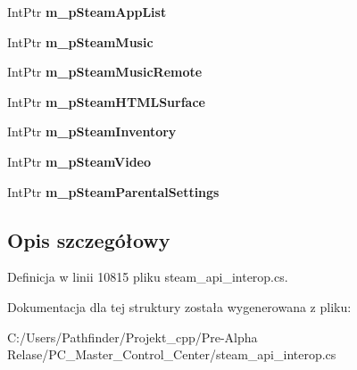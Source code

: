 \begin{DoxyCompactItemize}
Int\+Ptr {\bfseries m\+\_\+p\+Steam\+App\+List}
\item 
\mbox{\label{struct_valve_1_1_steamworks_1_1_c_steam_a_p_i_context_adb1ea8a12ae3246055bde67fe5fb74ab}} 
Int\+Ptr {\bfseries m\+\_\+p\+Steam\+Music}
\item 
\mbox{\label{struct_valve_1_1_steamworks_1_1_c_steam_a_p_i_context_a4adb9dee4d9bb64c9a5bdcc75bc0e0cf}} 
Int\+Ptr {\bfseries m\+\_\+p\+Steam\+Music\+Remote}
\item 
\mbox{\label{struct_valve_1_1_steamworks_1_1_c_steam_a_p_i_context_ab23262685f5c5d12b8a45ca9ebfdb1e7}} 
Int\+Ptr {\bfseries m\+\_\+p\+Steam\+H\+T\+M\+L\+Surface}
\item 
\mbox{\label{struct_valve_1_1_steamworks_1_1_c_steam_a_p_i_context_a8f2c7a17c310219b5944acb92caa17bb}} 
Int\+Ptr {\bfseries m\+\_\+p\+Steam\+Inventory}
\item 
\mbox{\label{struct_valve_1_1_steamworks_1_1_c_steam_a_p_i_context_a5f4a5ff627d565c6d969febff09afef0}} 
Int\+Ptr {\bfseries m\+\_\+p\+Steam\+Video}
\item 
\mbox{\label{struct_valve_1_1_steamworks_1_1_c_steam_a_p_i_context_a0027b83f04a52e78f4967ec2646979a7}} 
Int\+Ptr {\bfseries m\+\_\+p\+Steam\+Parental\+Settings}
\end{DoxyCompactItemize}


\subsection{Opis szczegółowy}


Definicja w linii 10815 pliku steam\+\_\+api\+\_\+interop.\+cs.



Dokumentacja dla tej struktury została wygenerowana z pliku\+:\begin{DoxyCompactItemize}
\item 
C\+:/\+Users/\+Pathfinder/\+Projekt\+\_\+cpp/\+Pre-\/\+Alpha Relase/\+P\+C\+\_\+\+Master\+\_\+\+Control\+\_\+\+Center/steam\+\_\+api\+\_\+interop.\+cs\end{DoxyCompactItemize}
